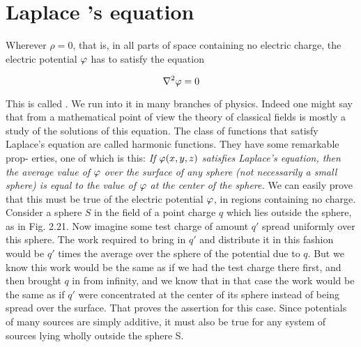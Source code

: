 \section{Laplace 's equation}

Wherever $\rho = 0$, that is, in all parts of space containing no electric
charge, the electric potential $\varphi$ has to satisfy the equation
\begin{framed}
\begin{equation}
  \nabla^2\varphi=0
\end{equation}
\end{framed}
This is called . We run into it in many branches
of physics. Indeed one might say that from a mathematical point of
view the theory of classical fields is mostly a study of the solutions of
this equation. The class of functions that satisfy Laplace's equation
are called harmonic functions. They have some remarkable prop-
erties, one of which is this: \emph{If $\varphi(x,y,z)$ satisfies Laplace's equation,
then the average value of $\varphi$ over the surface of any sphere (not necessarily
a small sphere) is equal to the value of $\varphi$ at the center of the
sphere.} We can easily prove that this must be true of the electric
potential $\varphi$, in regions containing no charge. Consider a sphere $S$
in the field of a point charge $q$ which lies outside the sphere, as in
Fig. 2.21. Now imagine some test charge of amount $q'$ spread uniformly
over this sphere. The work required to bring in $q'$ and distribute
it in this fashion would be $q'$ times the average over the sphere
of the potential due to $q$. But we know this work would be the same
as if we had the test charge there first, and then brought $q$ in from
infinity, and we know that in that case the work would be the same as
if $q'$ were concentrated at the center of its sphere instead of being
spread over the surface. That proves the assertion for this case.
Since potentials of many sources are simply additive, it must also be
true for any system of sources lying wholly outside the sphere S.

